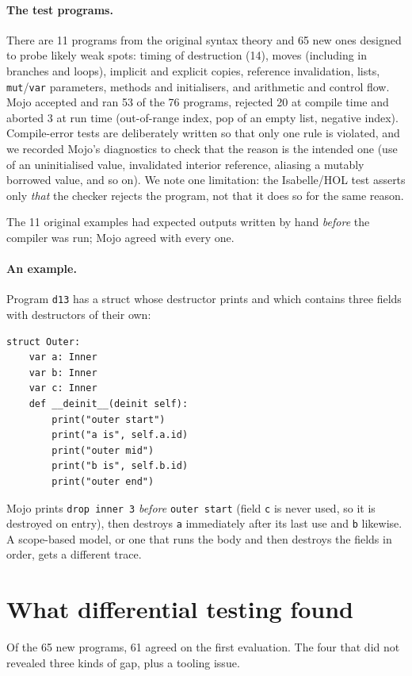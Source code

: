 \documentclass[11pt,a4paper]{article}
\newcommand{\IHOL}{Isabelle/HOL}
\newcommand{\code}[1]{\texttt{#1}}
\begin{document}
\paragraph{The test programs.}
There are 11 programs from the original syntax theory and 65 new ones designed
to probe likely weak spots: timing of destruction (14), moves (including in
branches and loops), implicit and explicit copies, reference invalidation,
lists, \code{mut}/\code{var} parameters, methods and initialisers, and
arithmetic and control flow. Mojo accepted and ran 53 of the 76 programs,
rejected 20 at compile time and aborted 3 at run time (out-of-range index, pop
of an empty list, negative index). Compile-error tests are deliberately written
so that only one rule is violated, and we recorded Mojo's diagnostics to check
that the reason is the intended one (use of an uninitialised value,
invalidated interior reference, aliasing a mutably borrowed value, and so on).
We note one limitation: the \IHOL{} test asserts only \emph{that} the checker rejects
the program, not that it does so for the same reason.

The 11 original examples had expected outputs written by hand \emph{before} the
compiler was run; Mojo agreed with every one.

\paragraph{An example.}
Program \code{d13} has a struct whose destructor prints and which contains
three fields with destructors of their own:
\begin{lstlisting}
struct Outer:
    var a: Inner
    var b: Inner
    var c: Inner
    def __deinit__(deinit self):
        print("outer start")
        print("a is", self.a.id)
        print("outer mid")
        print("b is", self.b.id)
        print("outer end")
\end{lstlisting}
Mojo prints \code{drop inner 3} \emph{before} \code{outer start} (field \code{c} is
never used, so it is destroyed on entry), then destroys \code{a} immediately after
its last use and \code{b} likewise. A scope-based model, or one that runs the body
and then destroys the fields in order, gets a different trace.

\section{What differential testing found}\label{sec:findings}

Of the 65 new programs, 61 agreed on the first evaluation. The four that did not
revealed three kinds of gap, plus a tooling issue.
\end{document}

